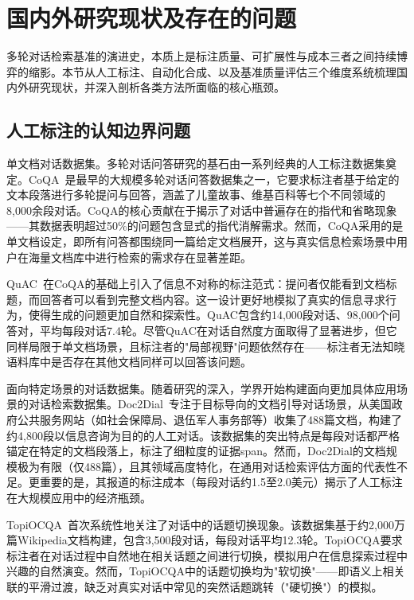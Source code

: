 \section{国内外研究现状及存在的问题}

多轮对话检索基准的演进史，本质上是标注质量、可扩展性与成本三者之间持续博弈的缩影。本节从人工标注、自动化合成、以及基准质量评估三个维度系统梳理国内外研究现状，并深入剖析各类方法所面临的核心瓶颈。

\subsection{人工标注的认知边界问题}

单文档对话数据集。多轮对话问答研究的基石由一系列经典的人工标注数据集奠定。CoQA~\citep{reddy-etal-2019-coqa}是最早的大规模多轮对话问答数据集之一，它要求标注者基于给定的文本段落进行多轮提问与回答，涵盖了儿童故事、维基百科等七个不同领域的8,000余段对话。CoQA的核心贡献在于揭示了对话中普遍存在的指代和省略现象——其数据表明超过50\%的问题包含显式的指代消解需求。然而，CoQA采用的是单文档设定，即所有问答都围绕同一篇给定文档展开，这与真实信息检索场景中用户在海量文档库中进行检索的需求存在显著差距。

QuAC~\citep{choi-etal-2018-quac}在CoQA的基础上引入了信息不对称的标注范式：提问者仅能看到文档标题，而回答者可以看到完整文档内容。这一设计更好地模拟了真实的信息寻求行为，使得生成的问题更加自然和探索性。QuAC包含约14,000段对话、98,000个问答对，平均每段对话7.4轮。尽管QuAC在对话自然度方面取得了显著进步，但它同样局限于单文档场景，且标注者的"局部视野"问题依然存在——标注者无法知晓语料库中是否存在其他文档同样可以回答该问题。

面向特定场景的对话数据集。随着研究的深入，学界开始构建面向更加具体应用场景的对话检索数据集。Doc2Dial~\citep{feng-etal-2020-doc2dial}专注于目标导向的文档引导对话场景，从美国政府公共服务网站（如社会保障局、退伍军人事务部等）收集了488篇文档，构建了约4,800段以信息咨询为目的的人工对话。该数据集的突出特点是每段对话都严格锚定在特定的文档段落上，标注了细粒度的证据span。然而，Doc2Dial的文档规模极为有限（仅488篇），且其领域高度特化，在通用对话检索评估方面的代表性不足。更重要的是，其报道的标注成本（每段对话约1.5至2.0美元）揭示了人工标注在大规模应用中的经济瓶颈。

TopiOCQA~\citep{adlakha-etal-2022-topiocqa}首次系统性地关注了对话中的话题切换现象。该数据集基于约2,000万篇Wikipedia文档构建，包含3,500段对话，每段对话平均12.3轮。TopiOCQA要求标注者在对话过程中自然地在相关话题之间进行切换，模拟用户在信息探索过程中兴趣的自然演变。然而，TopiOCQA中的话题切换均为"软切换"——即语义上相关联的平滑过渡，缺乏对真实对话中常见的突然话题跳转（"硬切换"）的模拟。


